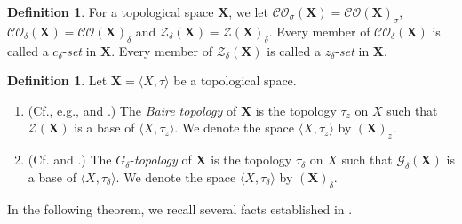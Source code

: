 \documentclass[12pt,twoside,leqno]{article}
\theoremstyle{plain}
\theoremstyle{definition}
\newtheorem{definition}[theorem]{Definition}
\theoremstyle{remark}
\begin{document}
\begin{definition}
	\label{s1:d16}
	For a topological space $\mathbf{X}$, we let $\mathcal{CO}_{\sigma}(\mathbf{X})=\mathcal{CO}(\mathbf{X})_{\sigma}$, $\mathcal{CO}_{\delta}(\mathbf{X})=\mathcal{CO}(\mathbf{X})_{\delta}$ and $\mathcal{Z}_{\delta}(\mathbf{X})=\mathcal{Z}(\mathbf{X})_{\delta}$. Every member of $\mathcal{CO}_{\delta}(\mathbf{X})$ is called a $c_{\delta}$-\emph{set} in $\mathbf{X}$. Every member of $\mathcal{Z}_{\delta}(\mathbf{X})$ is called a $z_{\delta}$-\emph{set} in $\mathbf{X}$.
\end{definition}

\begin{definition}
	\label{s1:d17} Let $\mathbf{X}=\langle X, \tau\rangle$ be a topological space. 
	\begin{enumerate}
		\item[(i)] (Cf., e.g., \cite{lr} and \cite{lorch}.) The \emph{Baire topology} of $\mathbf{X}$ is the topology $\tau_z$ on $X$ such that $\mathcal{Z}(\mathbf{X})$ is a base of $\langle X, \tau_z\rangle$. We denote the space $\langle X, \tau_z\rangle$ by $(\mathbf{X})_z$.
		\item[(ii)] (Cf. \cite{lr} and \cite{kow}.)  The $G_{\delta}$-\emph{topology} of $\mathbf{X}$  is the topology $\tau_{\delta}$ on $X$ such  that $\mathcal{G}_{\delta}(\mathbf{X})$ is a base of $\langle X, \tau_{\delta}\rangle$. We denote the space $\langle X, \tau_{\delta}\rangle$ by $(\mathbf{X})_{\delta}$.
	\end{enumerate}
\end{definition}

In the following theorem, we recall several facts established in \cite{kow}.
\end{document}
